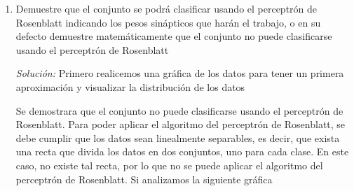 \documentclass{article}
\theoremstyle{mytheoremstyle}
\theoremstyle{mytheoremstyle}
\theoremstyle{myproblemstyle}
\begin{document}
\begin{enumerate}[label=(\alph*)]
  \item Demuestre que el conjunto se podrá clasificar usando el perceptrón de Rosenblatt indicando los pesos sinápticos que harán el trabajo, o en su defecto demuestre matemáticamente que el conjunto no puede clasificarse usando el perceptrón de Rosenblatt

        \textit{Solución:} Primero realicemos una gráfica de los datos para tener un primera aproximación y visualizar la distribución de los datos

        \begin{center}
        \end{center}

        Se demostrara que el conjunto no puede clasificarse usando el perceptrón de Rosenblatt. Para poder aplicar el algoritmo del perceptrón de Rosenblatt, se debe cumplir que los datos sean linealmente separables, es decir, que exista una recta que divida los datos en dos conjuntos, uno para cada clase. En este caso, no existe tal recta, por lo que no se puede aplicar el algoritmo del perceptrón de Rosenblatt. Si analizamos la siguiente gráfica


\end{enumerate}
\end{document}
